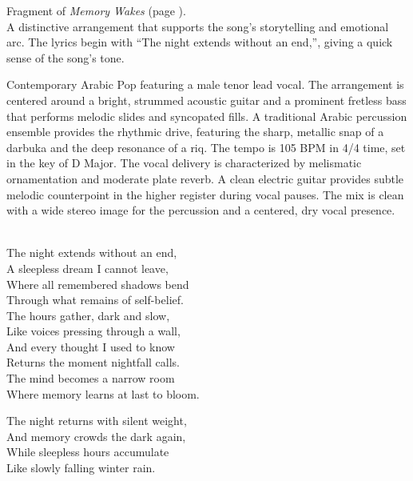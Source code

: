 

\begin{notes}
Fragment of \emph{Memory Wakes} (page \pageref{sec:memory-wakes}).\\
A distinctive arrangement that supports the song's storytelling and emotional arc. %
The lyrics begin with “The night extends without an end,”, giving a quick sense of the song’s tone.
\end{notes}

\begin{style}
Contemporary Arabic Pop featuring a male tenor lead vocal. %
The arrangement is centered around a bright, strummed acoustic guitar and a prominent fretless bass that performs melodic slides and syncopated fills. %
A traditional Arabic percussion ensemble provides the rhythmic drive, featuring the sharp, metallic snap of a darbuka and the deep resonance of a riq. %
The tempo is 105 BPM in 4/4 time, set in the key of D Major. %
The vocal delivery is characterized by melismatic ornamentation and moderate plate reverb. %
A clean electric guitar provides subtle melodic counterpoint in the higher register during vocal pauses. %
The mix is clean with a wide stereo image for the percussion and a centered, dry vocal presence.
\end{style}

\begin{lyrics}


\\
The night extends without an end,\\
A sleepless dream I cannot leave,\\
Where all remembered shadows bend\\
Through what remains of self-belief.\\
The hours gather, dark and slow,\\
Like voices pressing through a wall,\\
And every thought I used to know\\
Returns the moment nightfall calls.\\
The mind becomes a narrow room\\
Where memory learns at last to bloom.


The night returns with silent weight,\\
And memory crowds the dark again,\\
While sleepless hours accumulate\\
Like slowly falling winter rain.

\end{lyrics}

